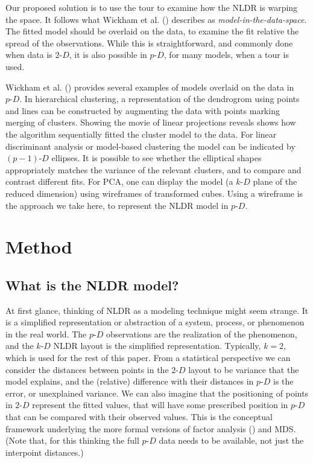 \documentclass[
  11pt,
  a4paper,
]{report}
\newcommand\pD{$p\text{-}D$}
\newcommand\kD{$k\text{-}D$}
\newcommand\gD{$2\text{-}D$}
\begin{document}
Our proposed solution is to use the tour to examine how the NLDR is
warping the space. It follows what Wickham et al.
() describes as
\emph{model-in-the-data-space}. The fitted model should be overlaid on
the data, to examine the fit relative the spread of the observations.
While this is straightforward, and commonly done when data is \gD{}, it
is also possible in \pD{}, for many models, when a tour is used.

Wickham et al. () provides several
examples of models overlaid on the data in \pD{}. In hierarchical
clustering, a representation of the dendrogrom using points and lines
can be constructed by augmenting the data with points marking merging of
clusters. Showing the movie of linear projections reveals shows how the
algorithm sequentially fitted the cluster model to the data. For linear
discriminant analysis or model-based clustering the model can be
indicated by \((p-1)\text{-}D\) ellipses. It is possible to see whether
the elliptical shapes appropriately matches the variance of the relevant
clusters, and to compare and contrast different fits. For PCA, one can
display the model (a \kD{} plane of the reduced dimension) using
wireframes of transformed cubes. Using a wireframe is the approach we
take here, to represent the NLDR model in \pD{}.

\section{Method}\label{sec-method}

\subsection{What is the NLDR model?}\label{what-is-the-nldr-model}

At first glance, thinking of NLDR as a modeling technique might seem
strange. It is a simplified representation or abstraction of a system,
process, or phenomenon in the real world. The \pD{} observations are the
realization of the phenomenon, and the \kD{} NLDR layout is the
simplified representation. Typically, \(k=2\), which is used for the
rest of this paper. From a statistical perspective we can consider the
distances between points in the \gD{} layout to be variance that the
model explains, and the (relative) difference with their distances in
\pD{} is the error, or unexplained variance. We can also imagine that
the positioning of points in \gD{} represent the fitted values, that
will have some prescribed position in \pD{} that can be compared with
their observed values. This is the conceptual framework underlying the
more formal versions of factor analysis
() and MDS. (Note that, for
this thinking the full \pD{} data needs to be available, not just the
interpoint distances.)
\end{document}
